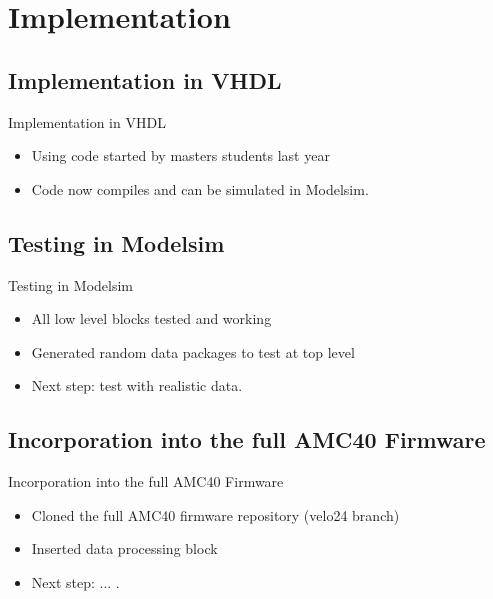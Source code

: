 \documentclass{beamer}
\begin{document}
\section{Implementation}

\subsection{Implementation in VHDL}

\begin{frame}{Implementation in VHDL}
  \begin{itemize}
    \item
      Using code started by masters students last year
    \item
      Code now compiles and can be simulated in Modelsim.
    \end{itemize}
\end{frame}


\subsection{Testing in Modelsim}

\begin{frame}{Testing in Modelsim}
  \begin{itemize}
    \item
      All low level blocks tested and working
    \item
      Generated random data packages to test at top level
    \item
      Next step: test with realistic data.
  \end{itemize}
\end{frame}


\subsection{Incorporation into the full AMC40 Firmware}

\begin{frame}{Incorporation into the full AMC40 Firmware}
  \begin{itemize}
    \item
      Cloned the full AMC40 firmware repository (velo24 branch)
    \item
      Inserted data processing block
    \item
      Next step: ... .
  \end{itemize}
\end{frame}
\end{document}
